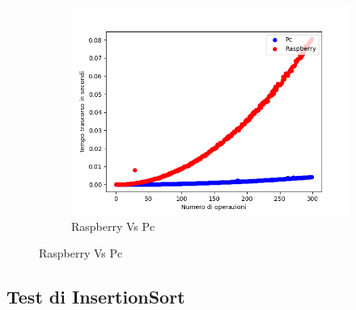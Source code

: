 \documentclass{article}
\begin{document}
\begin{figure}[h!]
\begin{subfigure}{0.6\textwidth}
					\includegraphics[width = \textwidth]{./Plots/PcVsRaspberry_BubbleSort.png}
					\caption{Raspberry Vs Pc}
				\end{subfigure}

			\end{figure}

		\clearpage
		\subsection{Test di InsertionSort}
\end{document}
